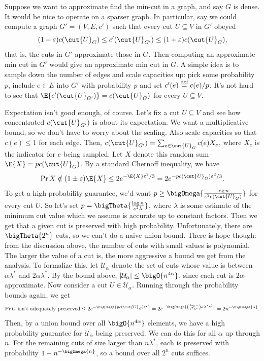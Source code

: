 \documentclass[12pt]{article}
\begin{document}
\def\U{\mathcal{U}}

Suppose we want to approximate find the min-cut in a graph, and say $G$ is
dense. It would be nice to operate on a sparser graph. In particular, say we
could compute a graph $G' = (V, E, c')$ such that every cut $U \subseteq V$ in
$G'$ obeyed
\[
  (1 - \eps)c(\cut{U}_G) \leq c'(\cut{U}_{G'}) \leq (1 + \eps)c(\cut{U}_G),
\]
that is, the cuts in $G'$ approximate those in $G$. Then computing an
approximate min cut in $G'$ would give an approximate min cut in $G$. A simple
idea is to sample down the number of edges and scale capacities up: pick some
probability $p$, include $e \in E$ into $G'$ with probability $p$ and set
$c'(e) \overset{\text{def}}{=} c(e)/p$. It's not hard to see that
$\E{c'(\cut{U}_{G'})} = c(\cut{U}_G)$ for every $U \subseteq V$.

Expectation isn't good enough, of course. Let's fix a cut $U \subseteq V$ and
see how concentrated $c(\cut{U}_{G'})$ is about its expectation. We want a
multiplicative bound, so we don't have to worry about the scaling. Also scale
capacities so that $c(e) \leq 1$ for each edge. Then,
$c(\cut{U}_{G'}) = \sum_{e \in \cut{U}_G}c(e)X_e$, where $X_e$ is the indicator
for $e$ being sampled. Let $X$ denote this random sum--$\E{X} = pc(\cut{U}_G)$.
By a standard Chernoff inequality, we have
\[
  \Pr{X \notin (1 \pm \eps)\E{X}} \leq 2e^{-\E{X}\eps^2/3}
                                  =    2e^{-pc(\cut{U}_G)\eps^2/3}.
\]
To get a high probability guarantee, we'd want $p \geq \bigOmega{\frac{\log
    n}{\eps^2 c(\cut{U}_G)}}$ for every cut $U$. So let's set $p = \bigTheta{\frac{\log n}{\eps^2 \lambda}}$, where $\lambda$ is some estimate of
the minimum cut value which we assume is accurate up to constant factors. Then
we get that a given cut is preserved with high probability. Unfortunately, there
are $\bigTheta{2^n}$ cuts, so we can't do a naive union bound. There is hope
though: from the discussion above, the number of cuts with small values is
polynomial. The larger the value of a cut is, the more aggressive a bound we get
from the analysis. To formalize this, let $\U_\alpha$ denote the set of cuts
whose value is between $\alpha\lambda^*$ and $2\alpha\lambda^*$. By the bound
above, $\sizeof{\U_\alpha} \leq \bigO{n^{4\alpha}}$, since each cut is
$2\alpha$-approximate. Now consider a cut $U \in \U_\alpha$. Running through the
probability bounds again, we get
\[
  \Pr{\text{$U$ isn't adequately preserved}}
  \leq 2e^{-\bigOmega{pc(\cut{U}_G)\eps^2}}
  =    2e^{-\bigOmega{\prac{\log n}{\eps^2\lambda^*}\alpha\lambda^*\eps^2}}
  =    2n^{-\bigOmega{\alpha}}.
\]
Then, by a union bound over all $\bigO{n^{4\alpha}}$ elements, we have a high
probability guarantee for $\U_\alpha$ being preserved. We can do this for all
$\alpha$ up through $n$. For the remaining cuts of size larger than
$n\lambda^*$, each is preserved with probability $1 - n^{-\bigOmega{n}}$, so a
bound over all $2^n$ cuts suffices.
\end{document}
